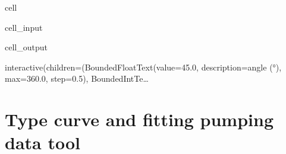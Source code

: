 \documentclass[letterpaper,10pt,english]{jupyterBook}
\begin{document}
\begin{sphinxuseclass}{cell}
\begin{sphinxVerbatimInput}
\begin{sphinxuseclass}{cell_input}
\begin{sphinxVerbatim}[commandchars=\\\{\}]
\end{sphinxVerbatim}

\end{sphinxuseclass}\end{sphinxVerbatimInput}
\begin{sphinxVerbatimOutput}

\begin{sphinxuseclass}{cell_output}
\begin{sphinxVerbatim}[commandchars=\\\{\}]
interactive(children=(BoundedFloatText(value=45.0, description=\PYGZsq{}angle (°)\PYGZsq{}, max=360.0, step=0.5), BoundedIntTe…
\end{sphinxVerbatim}

\end{sphinxuseclass}\end{sphinxVerbatimOutput}

\end{sphinxuseclass}
\sphinxstepscope


\chapter{Type curve and fitting pumping data tool}
\label{\detokenize{content/tools/type_curve_fit:type-curve-and-fitting-pumping-data-tool}}\label{\detokenize{content/tools/type_curve_fit::doc}}
\end{document}
